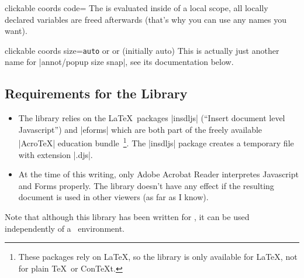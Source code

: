 \begin{pgfplotskey}{clickable coords code=}
	The  is evaluated inside of a local scope, all locally declared variables are freed afterwards (that's why you can use any names you want).
\end{pgfplotskey}

\begin{pgfplotskey}{clickable coords size=\texttt{auto} or  or  (initially auto)}
	This is actually just another name for |annot/popup size snap|, see its documentation below.
\end{pgfplotskey}

\subsection{Requirements for the Library}
	\begin{itemize}
		\item The library relies on the \LaTeX\ packages |insdljs| (``Insert document level Javascript'') and |eforms| which are both part of the freely available |AcroTeX| education bundle~\cite{acrotex}\footnote{These packages rely on \LaTeX, so the library is only available for \LaTeX, not for plain \TeX\ or Con\TeX t.}. The |insdljs| package creates a temporary file with extension |.djs|.
		
		\item At the time of this writing, only Adobe Acrobat Reader interpretes Javascript and Forms properly. The library doesn't have any effect if the resulting document is used in other viewers (as far as I know).

	\end{itemize}
	Note that although this library has been written for \PGFPlots, it can be used independently of a \PGFPlots\ environment.

